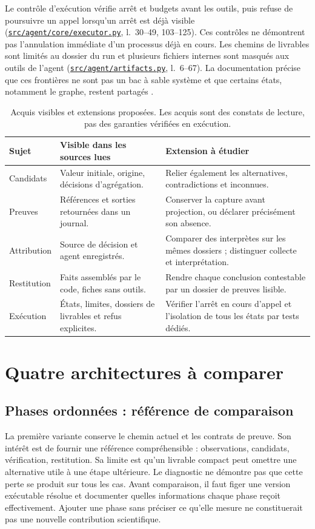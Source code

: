 \documentclass[11pt,a4paper]{article}
\newcommand{\src}[2]{{\small\href{../../#1}{\nolinkurl{#1}}, l.~#2}}
\begin{document}
Le contrôle d'exécution vérifie arrêt et budgets avant les outils, puis refuse
de poursuivre un appel lorsqu'un arrêt est déjà visible
(\src{src/agent/core/executor.py}{30--49, 103--125}). Ces contrôles ne
démontrent pas l'annulation immédiate d'un processus déjà en cours.
Les chemins de livrables sont limités au dossier du run et plusieurs fichiers
internes sont masqués aux outils de l'agent
(\src{src/agent/artifacts.py}{6--67}). La documentation précise que ces
frontières ne sont pas un bac à sable système et que certains états, notamment
le graphe, restent partagés \cite{contrats}.

\begin{table}[htbp]
\centering\small
\caption{Acquis visibles et extensions proposées. Les acquis sont des constats
de lecture, pas des garanties vérifiées en exécution.}
\label{tab:faits}
\begin{tabularx}{\textwidth}{@{}p{29mm}YY@{}}
\toprule Sujet & Visible dans les sources lues & Extension à étudier \\
\midrule
Candidats & Valeur initiale, origine, décisions d'agrégation. & Relier également
les alternatives, contradictions et inconnues. \\
Preuves & Références et sorties retournées dans un journal. & Conserver la
capture avant projection, ou déclarer précisément son absence. \\
Attribution & Source de décision et agent enregistrés. & Comparer des interprètes
sur les mêmes dossiers ; distinguer collecte et interprétation. \\
Restitution & Faits assemblés par le code, fiches sans outils. & Rendre chaque
conclusion contestable par un dossier de preuves lisible. \\
Exécution & États, limites, dossiers de livrables et refus explicites. & Vérifier
l'arrêt en cours d'appel et l'isolation de tous les états par tests dédiés. \\
\bottomrule
\end{tabularx}
\end{table}

\section{Quatre architectures à comparer}
\subsection{Phases ordonnées : référence de comparaison}
La première variante conserve le chemin actuel et les contrats de preuve. Son
intérêt est de fournir une référence compréhensible : observations, candidats,
vérification, restitution. Sa limite est qu'un livrable compact peut omettre
une alternative utile à une étape ultérieure. Le diagnostic ne démontre pas
que cette perte se produit sur tous les cas. Avant comparaison, il faut figer
une version exécutable résolue et documenter quelles informations chaque phase
reçoit effectivement. Ajouter une phase sans préciser ce qu'elle mesure ne
constituerait pas une nouvelle contribution scientifique.
\end{document}
